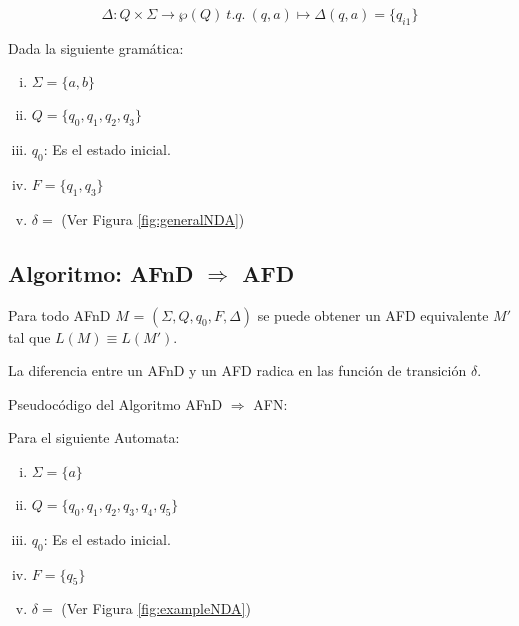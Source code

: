 \begin{equation}
\Delta:  Q \times \Sigma \longrightarrow \wp (Q)\ t.q.\ (q, a) \longmapsto \Delta (q, a) = \{q_{i1} \}
\end{equation}

\ejem Dada la siguiente gramática:

\begin{enumerate}[i.]

\item $\Sigma = \{a,b\}$

\item $Q = \{q_0,q_1,q_2,q_3\}$

\item $q_0$: Es el estado inicial.

\item $F = \{q_1,q_3\}$

\item $\delta = $ (Ver Figura \ref{fig:generalNDA})


\end{enumerate}



\subsection{Algoritmo: AFnD $\Rightarrow$ AFD}\label{algolAFnD2AFD}

{
\thm Para todo AFnD $M$ = $(\Sigma, Q,q_0,F,\Delta)$ se puede obtener un AFD equivalente $M\prime$ tal que $L(M) \equiv L(M\prime)$.
}

 La diferencia entre un AFnD y un AFD radica en las función de transición $\delta$.

\prog Pseudocódigo del Algoritmo AFnD $\Rightarrow$ AFN:



\ejem Para el siguiente Automata:

\begin{enumerate}[i.]

\item $\Sigma = \{a\}$

\item $Q = \{q_0,q_1,q_2,q_3,q_4,q_5\}$

\item $q_0$: Es el estado inicial.

\item $F = \{q_5\}$

\item $\delta = $ (Ver Figura \ref{fig:exampleNDA})

\end{enumerate}

